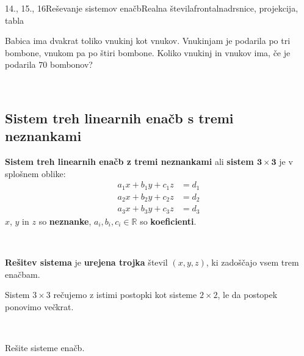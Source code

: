 \begin{priprava}{14., 15., 16}{}{Reševanje sistemov enačb}{Realna števila}{frontalna}{drsnice, projekcija, tabla}
\begin{naloga}
            \end{naloga}

            \begin{naloga}
                Babica ima dvakrat toliko vnukinj kot vnukov. Vnukinjam je podarila po tri bombone, vnukom pa po štiri bombone.
                Koliko vnukinj in vnukov ima, če je podarila $70$ bombonov?
                
            \end{naloga}

        


~~~\\
      
            
            \subsection{Sistem treh linearnih enačb s tremi neznankami}

                \textbf{Sistem treh linearnih enačb z tremi neznankami} ali \textbf{sistem $\mathbf{3\times 3}$} je v splošnem oblike:
                    $$\begin{aligned}
                            a_1x+b_1y+c_1z&=d_1 \\ a_2x+b_2y+c_2z&=d_2 \\ a_3x+b_3y+c_3z&=d_3
                        \end{aligned}$$
                $x$, $y$ in $z$ so \textbf{neznanke}, $a_i,b_i,c_i\in\mathbb{R}$ so \textbf{koeficienti}.
            
~
            
                \textbf{Rešitev sistema} je \textbf{urejena trojka} števil $(x,y,z)$, ki zadoščajo vsem trem enačbam.
            

            
                    Sistem $3\times 3$ rečujemo z istimi postopki kot sisteme $2\times 2$, le da postopek ponovimo večkrat.
            

        
~~~\\


        
            \begin{naloga}
                Rešite sisteme enačb.
                \begin{multicols}{2}
                \begin{itemize}
                    

\end{itemize}
\end{multicols}
\end{naloga}
\end{priprava}
